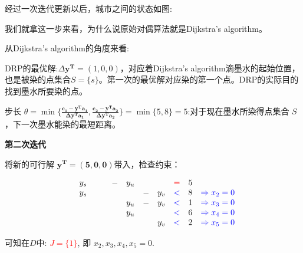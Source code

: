 \documentclass[11pt]{article}
\begin{document}
\begin{CJK}{UTF8}{gbsn}
经过一次迭代更新以后，城市之间的状态如图:
\begin{figure}[H]
\end{figure}

我们就拿这一步来看，为什么说原始对偶算法就是Dijkstra's algorithm。

从Dijkstra's algorithm的角度来看:

DRP的最优解:$\Delta \mathbf{y^T} = (1, 0, 0)$，对应着Dijkstra's algorithm滴墨水的起始位置，也是被染的点集合$S = \{s\}$。第一次的最优解对应染的第一个点。DRP的实际目的找到墨水所要染的点。

步长 $\theta = \min \{ \frac{ \mathbf{c_1 - y^Ta_1} }{ \mathbf{\Delta y^T a_1}  }, \frac{ \mathbf{c_2 - y^Ta_2} }{ \mathbf{\Delta y^T a_2}  }  \} = \min\{ 5, 8\} = 5$:对于现在墨水所染得点集合 $S$ ，下一次墨水能染的最短距离。


\textbf{第二次迭代}

将新的可行解 $\mathbf{ y^T = (5, 0, 0) }$带入，检查约束：
 \begin{small}
\[
\begin{array}{rrrrrrrrrrl}
 & y_s & &      &-& y_u & &     &  \textcolor{red}{=}& 5 &  \\
 & y_s & &      & &     &-& y_v &   \textcolor{blue}{<}&  8 & \textcolor{blue}{\Rightarrow  x_{2}  = 0}  \\
  &     & &      & & y_u &-& y_v &   \textcolor{blue}{<}&  1 & \textcolor{blue}{\Rightarrow  x_{3}  = 0} \\
 &     & &    &   & y_u & &     &   \textcolor{blue}{<}&  6 & \textcolor{blue}{\Rightarrow  x_{4}  = 0}  \\
 &     & &   & &     & & y_v &   \textcolor{blue}{<}&  2 & \textcolor{blue}{\Rightarrow  x_{5}  = 0}
\end{array} \nonumber
\]
\end{small}
可知在$D$中:  \textcolor{red}{$J=\{ 1\}$}, 即 $x_2,x_3,x_4,x_5=0$.


\end{CJK}
\end{document}

